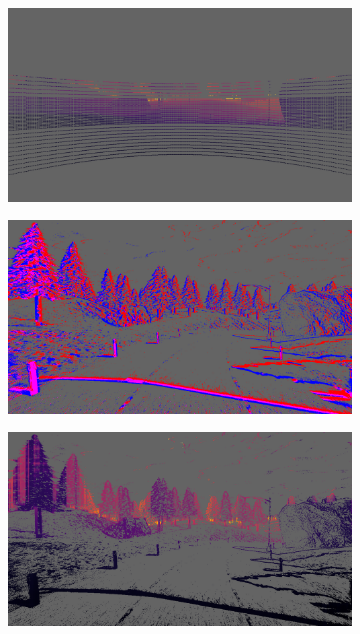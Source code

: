 \begin{figure}
  \centering
  \begin{subfigure}{0.49\linewidth}
    \includegraphics[width=\linewidth]{mainmatter/figures/5_depth_transf/sparse_network_cmp/lidar_lightgray_fixed.png}
    \label{subfig:delta:sparse_network_cmp:lidar}
  \end{subfigure}
  \begin{subfigure}{0.49\linewidth}
    \includegraphics[width=\linewidth]{mainmatter/figures/5_depth_transf/sparse_network_cmp/events_lightgray_fixed.png}
    \label{subfig:delta:sparse_network_cmp:evts}
  \end{subfigure}
  \begin{subfigure}{0.49\linewidth}
    \includegraphics[width=\linewidth]{mainmatter/figures/5_depth_transf/sparse_network_cmp/predbf_lightgray_fixed.png}

\end{subfigure}
\end{figure}
